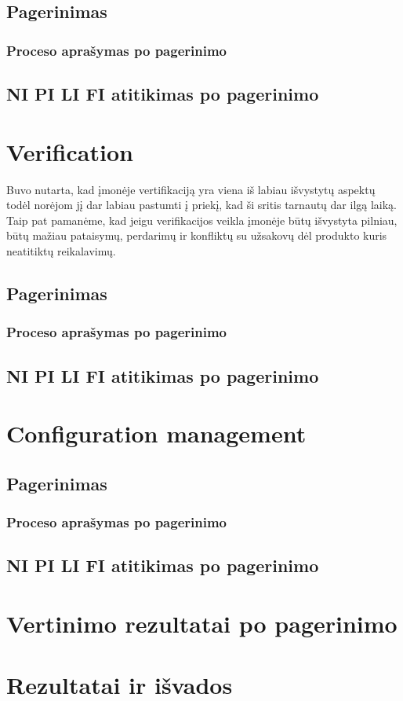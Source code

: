 \documentclass{VUMIFPSkursinis}
\begin{document}
		\subsection{Pagerinimas}
			\subsubsection{Proceso aprašymas po pagerinimo}
		\subsection{NI PI LI FI atitikimas po pagerinimo}
	\section{Verification}
		Buvo nutarta, kad įmonėje vertifikaciją yra viena iš labiau išvystytų aspektų todėl norėjom jį dar labiau pastumti į priekį, kad ši sritis tarnautų dar ilgą laiką. 
		Taip pat pamanėme, kad jeigu verifikacijos veikla įmonėje būtų išvystyta pilniau, būtų mažiau pataisymų, perdarimų ir konfliktų su užsakovų dėl produkto kuris neatitiktų reikalavimų.
		\subsection{Pagerinimas}
			\subsubsection{Proceso aprašymas po pagerinimo}
		\subsection{NI PI LI FI atitikimas po pagerinimo}
	\section{Configuration management}
		\subsection{Pagerinimas}
			\subsubsection{Proceso aprašymas po pagerinimo}
		\subsection{NI PI LI FI atitikimas po pagerinimo}
	\section{Vertinimo rezultatai po pagerinimo}
	\section{Rezultatai ir išvados}
\end{document}

